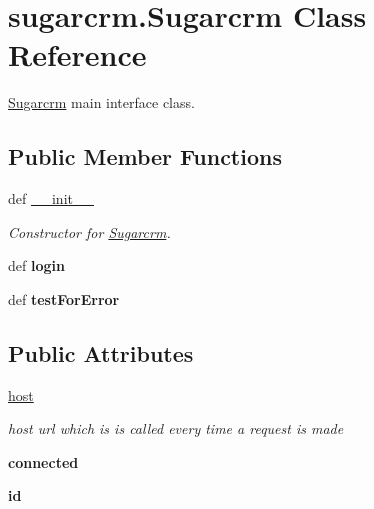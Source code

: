 \hypertarget{classsugarcrm_1_1_sugarcrm}{
\section{sugarcrm.Sugarcrm Class Reference}
\label{classsugarcrm_1_1_sugarcrm}
}


\hyperlink{classsugarcrm_1_1_sugarcrm}{Sugarcrm} main interface class.  


\subsection*{Public Member Functions}
\begin{DoxyCompactItemize}
\item 
def \hyperlink{classsugarcrm_1_1_sugarcrm_ae4e295979299029cc6f9b2c37d060eaf}{\_\-\_\-init\_\-\_\-}
\begin{DoxyCompactList}\small\item\em Constructor for \hyperlink{classsugarcrm_1_1_sugarcrm}{Sugarcrm}. \item\end{DoxyCompactList}\item 
\hypertarget{classsugarcrm_1_1_sugarcrm_a5265dd6483b0fa66f2659179363d8c6a}{
def {\bfseries login}}
\label{classsugarcrm_1_1_sugarcrm_a5265dd6483b0fa66f2659179363d8c6a}

\item 
\hypertarget{classsugarcrm_1_1_sugarcrm_abb0886fdd1b4c3898384b129206bb688}{
def {\bfseries testForError}}
\label{classsugarcrm_1_1_sugarcrm_abb0886fdd1b4c3898384b129206bb688}

\end{DoxyCompactItemize}
\subsection*{Public Attributes}
\begin{DoxyCompactItemize}
\item 
\hypertarget{classsugarcrm_1_1_sugarcrm_a8851219e2bf6e8dd1b7404443e79221a}{
\hyperlink{classsugarcrm_1_1_sugarcrm_a8851219e2bf6e8dd1b7404443e79221a}{host}}
\label{classsugarcrm_1_1_sugarcrm_a8851219e2bf6e8dd1b7404443e79221a}

\begin{DoxyCompactList}\small\item\em host url which is is called every time a request is made \item\end{DoxyCompactList}\item 
\hypertarget{classsugarcrm_1_1_sugarcrm_a6649badb2b4f2f23c4dbdef43d45677f}{
{\bfseries connected}}
\label{classsugarcrm_1_1_sugarcrm_a6649badb2b4f2f23c4dbdef43d45677f}

\item 
\hypertarget{classsugarcrm_1_1_sugarcrm_a8fba718e5204012ba888079f1fef08ef}{
{\bfseries id}}
\label{classsugarcrm_1_1_sugarcrm_a8fba718e5204012ba888079f1fef08ef}

\end{DoxyCompactItemize}


